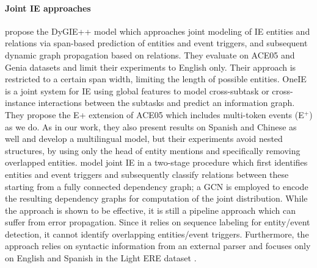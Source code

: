 \documentclass[11pt]{article}
\begin{document}
\paragraph{Joint IE approaches}
\citet{wadden-etal-2019-entity} propose the DyGIE++ model which approaches joint modeling of IE entities and relations via span-based prediction of entities and event triggers, and subsequent dynamic graph propagation based on relations. They evaluate on ACE05 and Genia datasets and limit their experiments to English only. Their approach is restricted to a certain span width, limiting the length of possible entities.
OneIE \cite{lin-etal-2020-joint} is a joint system for IE using global features to model cross-subtask or cross-instance interactions between the subtasks and predict an information graph. They propose the E+ extension of ACE05 which includes multi-token events (E$^+$) as we do. As in our work, they also present results on Spanish and Chinese as well and develop a multilingual model, but their experiments avoid nested structures, by using only the head of entity mentions and specifically removing overlapped entities.
\citet{nguyen-etal-2022-joint} model joint IE in a two-stage procedure which first identifies entities and event triggers and subsequently classify relations between these starting from a fully connected dependency graph;
a GCN is employed to encode the resulting dependency graphs for computation of the joint distribution.
While the approach is shown to be effective, it is still a pipeline approach which can suffer from error propagation. Since it relies on 
sequence labeling for entity/event detection, it cannot identify overlapping entities/event triggers. Furthermore, the approach relies on syntactic information from an external parser and focuses only on English and Spanish in the Light ERE dataset \citep{song-etal-2015-light}.
\end{document}
